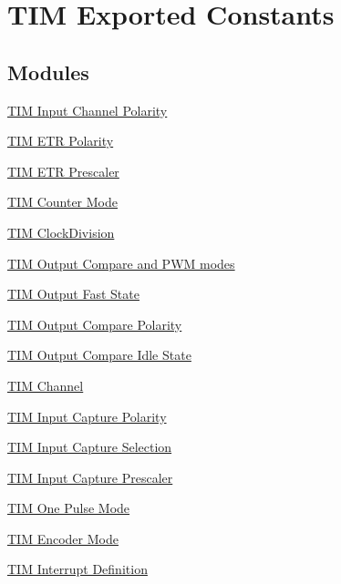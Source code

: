 \hypertarget{group___t_i_m___exported___constants}{\section{T\-I\-M Exported Constants}
\label{group___t_i_m___exported___constants}
}
\subsection*{Modules}
\begin{DoxyCompactItemize}
\item 
\hyperlink{group___t_i_m___input___channel___polarity}{T\-I\-M Input Channel Polarity}
\item 
\hyperlink{group___t_i_m___e_t_r___polarity}{T\-I\-M E\-T\-R Polarity}
\item 
\hyperlink{group___t_i_m___e_t_r___prescaler}{T\-I\-M E\-T\-R Prescaler}
\item 
\hyperlink{group___t_i_m___counter___mode}{T\-I\-M Counter Mode}
\item 
\hyperlink{group___t_i_m___clock_division}{T\-I\-M Clock\-Division}
\item 
\hyperlink{group___t_i_m___output___compare__and___p_w_m__modes}{T\-I\-M Output Compare and P\-W\-M modes}
\item 
\hyperlink{group___t_i_m___output___fast___state}{T\-I\-M Output Fast State}
\item 
\hyperlink{group___t_i_m___output___compare___polarity}{T\-I\-M Output Compare Polarity}
\item 
\hyperlink{group___t_i_m___output___compare___idle___state}{T\-I\-M Output Compare Idle State}
\item 
\hyperlink{group___t_i_m___channel}{T\-I\-M Channel}
\item 
\hyperlink{group___t_i_m___input___capture___polarity}{T\-I\-M Input Capture Polarity}
\item 
\hyperlink{group___t_i_m___input___capture___selection}{T\-I\-M Input Capture Selection}
\item 
\hyperlink{group___t_i_m___input___capture___prescaler}{T\-I\-M Input Capture Prescaler}
\item 
\hyperlink{group___t_i_m___one___pulse___mode}{T\-I\-M One Pulse Mode}
\item 
\hyperlink{group___t_i_m___encoder___mode}{T\-I\-M Encoder Mode}
\item 
\hyperlink{group___t_i_m___interrupt__definition}{T\-I\-M Interrupt Definition}

\end{DoxyCompactItemize}
